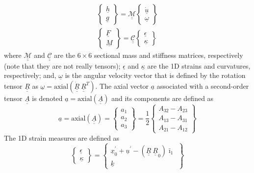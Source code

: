 \documentclass{aiaa-tc}
\newcommand{\tens}[1]{\underline{\underline{#1}}}
\renewcommand{\vec}[1]{\underline{#1}}
\begin{document}
\begin{align}
	\label{ConstitutiveMass}
	\begin{Bmatrix}
	\underline{h} \\
	\underline{g}
	\end{Bmatrix}
	= \underline{\underline{\mathcal{M}}} \begin{Bmatrix}
	\dot{\underline{u}} \\
	\underline{\omega}
	\end{Bmatrix} \\
	\label{ConstitutiveStiff}
	\begin{Bmatrix}
	\underline{F} \\
	\underline{M}
	\end{Bmatrix}
	= \underline{\underline{\mathcal{C}}} \begin{Bmatrix}
	\underline{\epsilon} \\
	\underline{\kappa}
	\end{Bmatrix}
\end{align}
where $\underline{\underline{\mathcal{M}}}$ and
$\underline{\underline{\mathcal{C}}}$ are the $6 \times 6$ sectional mass
and stiffness matrices, respectively (note that they are not really tensors);
$\underline{\epsilon}$ and $\underline{\kappa}$ are the 1D strains and
curvatures, respectively; and, $\underline{\omega}$ is the angular velocity
vector that is defined by the rotation tensor $\underline{\underline{R}}$ as
$\underline{\omega} =
\mathrm{axial}(\dot{\underline{\underline{R}}}~\underline{\underline{R}}^T)$. The axial vector $\vec{a}$ associated with a second-order tensor $\tens{A}$ is denoted $\vec{a}=\mathrm{axial}(\tens{A})$ and its components are defined as
\begin{equation}
    \label{axial}
    \vec{a} = \mathrm{axial}(\tens{A})=\begin{Bmatrix}
    a_1 \\
    a_2 \\
    a_3
    \end{Bmatrix}
    =\frac{1}{2}
    \begin{Bmatrix}
    A_{32}-A_{23} \\
    A_{13}-A_{31} \\
    A_{21}-A_{12}
    \end{Bmatrix}
\end{equation}
The 1D strain measures are defined as
\begin{equation}
    \label{1DStrain}
    \begin{Bmatrix}
        \vec{\epsilon} \\
        \vec{\kappa}
    \end{Bmatrix}
    =
    \begin{Bmatrix}
        \vec{x}^\prime_0 + \vec{u}^\prime - (\tens{R} ~\tens{R}_0) \bar{\imath}_1 \\
        \vec{k}
    \end{Bmatrix}
\end{equation}
\end{document}
